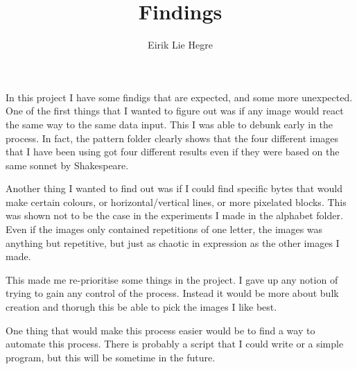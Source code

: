 \documentclass[12pt, letterpaper]{article}
\title{Findings}
\author{Eirik Lie Hegre}
\begin{document}
\maketitle

In this project I have some findigs that are expected, and some more unexpected.
One of the first things that I wanted to figure out was if any image would react
the same way to the same data input. This I was able to debunk early in the
process. In fact, the pattern folder clearly shows that the four different
images that I have been using got four different results even if they were based
on the same sonnet by Shakespeare. \par
Another thing I wanted to find out was if I could find specific bytes that would
make certain colours, or horizontal/vertical lines, or more pixelated blocks.
This was shown not to be the case in the experiments I made in the alphabet
folder. Even if the images only contained repetitions of one letter, the images
was anything but repetitive, but just as chaotic in expression as the other
images I made. \par
This made me re-prioritise some things in the project. I gave up any notion of
trying to gain any control of the process. Instead it would be more about bulk
creation and thorugh this be able to pick the images I like best. \par
One thing that would make this process easier would be to find a way to automate
this process. There is probably a script that I could write or a simple program,
but this will be sometime in the future.
\end{document}
